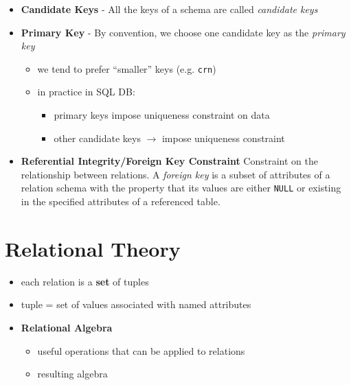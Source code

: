 \documentclass{../cheatsheet}
\begin{document}
\begin{multicols*}{2}
\begin{itemize}
        \item \textbf{Candidate Keys} - All the keys of a schema are called
            \textit{candidate keys}

        \item \textbf{Primary Key} - By convention, we choose one candidate key
            as the \textit{primary key}

            \begin{itemize}
                \item we tend to prefer ``smaller'' keys (e.g. \texttt{crn})
                \item in practice in SQL DB:
                    \begin{itemize}
                        \item primary keys impose uniqueness constraint on data
                        \item other candidate keys $\rightarrow$ impose
                            uniqueness constraint
                    \end{itemize}
            \end{itemize}

        \item \textbf{Referential Integrity/Foreign Key Constraint} Constraint
            on the relationship between relations. A \textit{foreign key} is a
            subset of attributes of a relation schema with the property that its
            values are either \texttt{NULL} or existing in the specified
            attributes of a referenced table.
    \end{itemize}

    \section{Relational Theory}
    \begin{itemize}
        \item each relation is a \textbf{set} of tuples
        \item tuple = set of values associated with named attributes
        \item \textbf{Relational Algebra}
            \begin{itemize}
                \item useful operations that can be applied to relations
                \item resulting algebra
            \end{itemize}
    \end{itemize}


\end{multicols*}
\end{document}
